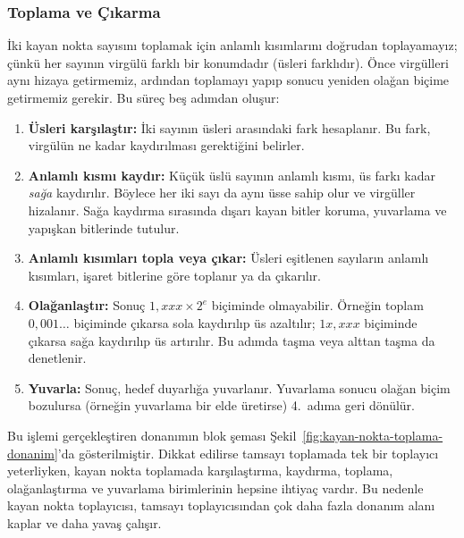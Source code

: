 \subsubsection{Toplama ve Çıkarma}

İki kayan nokta sayısını toplamak için anlamlı kısımlarını doğrudan toplayamayız; çünkü her sayının virgülü farklı bir konumdadır (üsleri farklıdır). Önce virgülleri aynı hizaya getirmemiz, ardından toplamayı yapıp sonucu yeniden olağan biçime getirmemiz gerekir. Bu süreç beş adımdan oluşur:

\begin{enumerate}
\item \textbf{Üsleri karşılaştır:} İki sayının üsleri arasındaki fark hesaplanır. Bu fark, virgülün ne kadar kaydırılması gerektiğini belirler.

\item \textbf{Anlamlı kısmı kaydır:} Küçük üslü sayının anlamlı kısmı, üs farkı kadar \emph{sağa} kaydırılır. Böylece her iki sayı da aynı üsse sahip olur ve virgüller hizalanır. Sağa kaydırma sırasında dışarı kayan bitler koruma, yuvarlama ve yapışkan bitlerinde tutulur.

\item \textbf{Anlamlı kısımları topla veya çıkar:} Üsleri eşitlenen sayıların anlamlı kısımları, işaret bitlerine göre toplanır ya da çıkarılır.

\item \textbf{Olağanlaştır:} Sonuç $1{,}xxx \times 2^e$ biçiminde olmayabilir. Örneğin toplam $0{,}001\ldots$ biçiminde çıkarsa sola kaydırılıp üs azaltılır; $1x{,}xxx$ biçiminde çıkarsa sağa kaydırılıp üs artırılır. Bu adımda taşma veya alttan taşma da denetlenir.

\item \textbf{Yuvarla:} Sonuç, hedef duyarlığa yuvarlanır. Yuvarlama sonucu olağan biçim bozulursa (örneğin yuvarlama bir elde üretirse) 4.~adıma geri dönülür.
\end{enumerate}

Bu işlemi gerçekleştiren donanımın blok şeması Şekil~\ref{fig:kayan-nokta-toplama-donanim}'da gösterilmiştir. Dikkat edilirse tamsayı toplamada tek bir toplayıcı yeterliyken, kayan nokta toplamada karşılaştırma, kaydırma, toplama, olağanlaştırma ve yuvarlama birimlerinin hepsine ihtiyaç vardır. Bu nedenle kayan nokta toplayıcısı, tamsayı toplayıcısından çok daha fazla donanım alanı kaplar ve daha yavaş çalışır.

